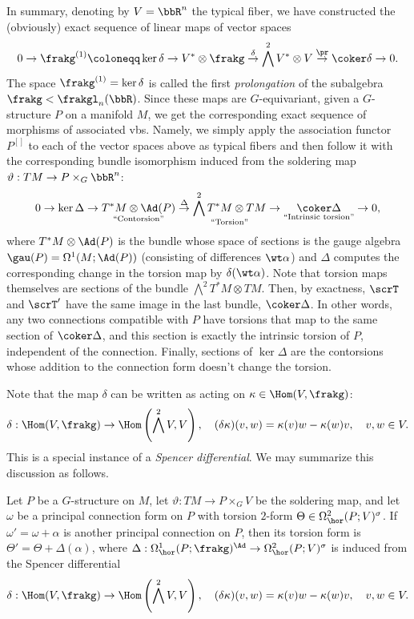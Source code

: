 In summary, denoting by $V=\bbR^n$ the typical fiber, we have constructed the (obviously) exact sequence of linear maps of vector spaces
\[0\to\frakg^{(1)}\coloneqq\ker\delta\to V^\ast\otimes\frakg\overset{\delta}{\to}\bigwedge^2 V^\ast \otimes V\overset{\pr}{\to}\coker\delta\to 0.\]
The space $\frakg^{(1)}=\ker\delta$ is called the first \emph{prolongation} of the subalgebra $\frakg<\frakgl_n(\bbR)$. Since these maps are $G$-equivariant, given a $G$-structure $P$ on a manifold $M$, we get the corresponding exact sequence of morphisms of associated \glspl{vb}. Namely, we simply apply the association functor $P^{[]}$ to each of the vector spaces above as typical fibers and then follow it with the corresponding bundle isomorphism induced from the soldering map $\vartheta:TM\to P\times_G \bbR^n$:
\[ 0\to \ker \Delta \to \underset{\text{``Contorsion''}}{T^\ast M\otimes \Ad(P)}\overset{\Delta}{\to} \underset{\text{``Torsion''}}{\bigwedge^2 T^\ast M\otimes TM}\to \underset{\text{``Intrinsic torsion''}}{\coker \Delta}\to 0,\]
where $ T^\ast M\otimes \Ad(P)$ is the bundle whose space of sections is the gauge algebra $\gau(P)=\Omega^1(M;\Ad(P))$ (consisting of differences $\wt\alpha$) and $\Delta$ computes  the corresponding change in the torsion map by $\delta(\wt\alpha)$. Note that torsion maps themselves are sections of the bundle $\bigwedge^2 T^\ast M\otimes TM$. Then, by exactness, $\scrT$ and $\scrT'$ have the same image in the last bundle, $\coker\Delta$. In other words, any two connections compatible with $P$ have torsions that map to the same section of $\coker\Delta$, and this section is exactly the intrinsic torsion of $P$, independent of the connection. Finally, sections of $\ker\Delta$ are the contorsions whose addition to the connection form doesn't change the torsion.

Note that the map $\delta$ can be written as acting on $\kappa\in\Hom(V,\frakg)$:
\[\delta:\Hom(V,\frakg)\to \Hom\left(\bigwedge^2 V,V\right),\quad (\delta\kappa)(v,w)=\kappa(v) w-\kappa(w) v,\quad v,w\in V.\]
This is a special instance  of a \emph{Spencer differential}. We may summarize this discussion as follows.

\begin{prop}
    Let $P$ be a $G$-structure on $M$, let $\vartheta:TM\to P\times_G V$ be the soldering map, and let $\omega$ be a principal connection form on $P$ with torsion $2$-form $\Theta\in\Omega^2_{\hor}(P;V)^\sigma$. If $\omega'=\omega+\alpha$ is another principal connection on $P$, then its torsion form is $\Theta'=\Theta+\Delta(\alpha)$, where $\Delta:\Omega^1_{\hor}(P;\frakg)^\Ad\to \Omega^2_{\hor}(P;V)^\sigma$ is induced from the Spencer differential 
    \[\delta:\Hom(V,\frakg)\to \Hom\left(\bigwedge^2 V,V\right),\quad (\delta\kappa) (v,w)=\kappa(v)w-\kappa(w)v,\quad v,w\in V.\]
\end{prop}

